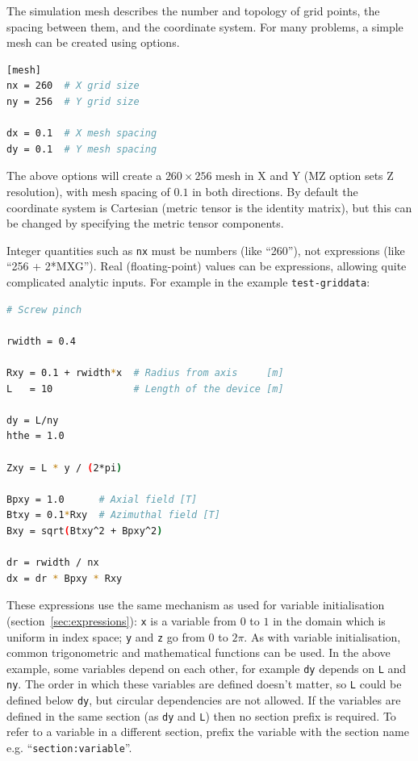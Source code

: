 \documentclass[12pt]{article}
\begin{document}
The simulation mesh describes the number and topology of grid points, the spacing between them, and
the coordinate system. For many problems, a simple mesh can be created using options.
\begin{lstlisting}[language=bash,numbers=none]
[mesh]
nx = 260  # X grid size
ny = 256  # Y grid size

dx = 0.1  # X mesh spacing
dy = 0.1  # Y mesh spacing
\end{lstlisting}
The above options will create a $260\times 256$ mesh in X and Y (MZ option sets Z resolution),
with mesh spacing of $0.1$ in both directions. By default the coordinate system is
Cartesian (metric tensor is the identity matrix), but this can be changed by
specifying
the metric tensor components.

Integer quantities such as \texttt{nx} must be numbers (like ``260''), not expressions (like ``256 + 2*MXG'').
Real (floating-point) values can be expressions, allowing quite complicated analytic inputs.
For example in the example \texttt{test-griddata}:
\begin{lstlisting}[language=bash,numbers=none]
# Screw pinch

rwidth = 0.4

Rxy = 0.1 + rwidth*x  # Radius from axis     [m]
L   = 10              # Length of the device [m]

dy = L/ny
hthe = 1.0

Zxy = L * y / (2*pi)

Bpxy = 1.0      # Axial field [T]
Btxy = 0.1*Rxy  # Azimuthal field [T]
Bxy = sqrt(Btxy^2 + Bpxy^2)

dr = rwidth / nx
dx = dr * Bpxy * Rxy
\end{lstlisting}

These expressions use the same mechanism as used for variable initialisation (section~\ref{sec:expressions}): \texttt{x} is a variable from $0$ to $1$ in the domain which is uniform in index space; \texttt{y} and \texttt{z} go from $0$ to $2\pi$. As with variable initialisation, common trigonometric and mathematical functions can be used.
In the above example, some variables depend on each other, for example \texttt{dy} depends on \texttt{L} and \texttt{ny}. The order in which these variables are defined doesn't matter, so \texttt{L} could be defined below \texttt{dy}, but circular dependencies are not allowed. If the variables are defined in the same section (as \texttt{dy} and \texttt{L}) then no section prefix is required. To refer to a variable in a different section, prefix the variable with the section name e.g. ``\texttt{section:variable}''.
\end{document}
